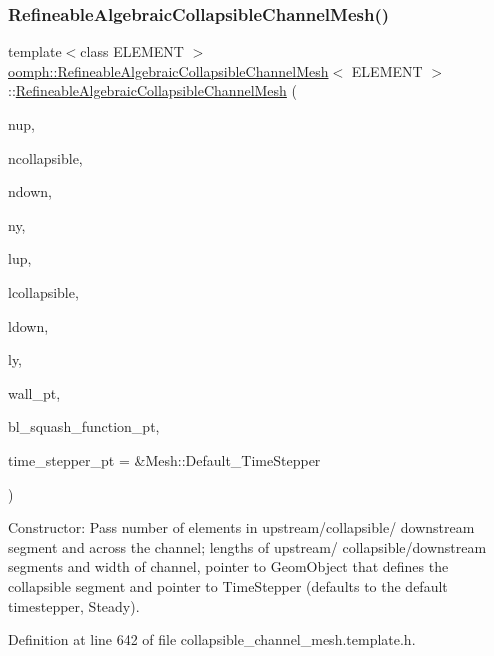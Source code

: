 \subsubsection{\texorpdfstring{Refineable\+Algebraic\+Collapsible\+Channel\+Mesh()}{RefineableAlgebraicCollapsibleChannelMesh()}\hspace{0.1cm}{\footnotesize\ttfamily [2/2]}}
{\footnotesize\ttfamily template$<$class E\+L\+E\+M\+E\+NT $>$ \\
\hyperlink{classoomph_1_1RefineableAlgebraicCollapsibleChannelMesh}{oomph\+::\+Refineable\+Algebraic\+Collapsible\+Channel\+Mesh}$<$ E\+L\+E\+M\+E\+NT $>$\+::\hyperlink{classoomph_1_1RefineableAlgebraicCollapsibleChannelMesh}{Refineable\+Algebraic\+Collapsible\+Channel\+Mesh} (\begin{DoxyParamCaption}\item[{const unsigned \&}]{nup,  }\item[{const unsigned \&}]{ncollapsible,  }\item[{const unsigned \&}]{ndown,  }\item[{const unsigned \&}]{ny,  }\item[{const double \&}]{lup,  }\item[{const double \&}]{lcollapsible,  }\item[{const double \&}]{ldown,  }\item[{const double \&}]{ly,  }\item[{Geom\+Object $\ast$}]{wall\+\_\+pt,  }\item[{\hyperlink{classoomph_1_1CollapsibleChannelDomain_a2bf1d7943bfac134a5c27a54c7e1faed}{Collapsible\+Channel\+Domain\+::\+B\+L\+Squash\+Fct\+Pt}}]{bl\+\_\+squash\+\_\+function\+\_\+pt,  }\item[{Time\+Stepper $\ast$}]{time\+\_\+stepper\+\_\+pt = {\ttfamily \&Mesh\+:\+:Default\+\_\+TimeStepper} }\end{DoxyParamCaption})\hspace{0.3cm}{\ttfamily [inline]}}



Constructor\+: Pass number of elements in upstream/collapsible/ downstream segment and across the channel; lengths of upstream/ collapsible/downstream segments and width of channel, pointer to Geom\+Object that defines the collapsible segment and pointer to Time\+Stepper (defaults to the default timestepper, Steady). 



Definition at line 642 of file collapsible\+\_\+channel\+\_\+mesh.\+template.\+h.



